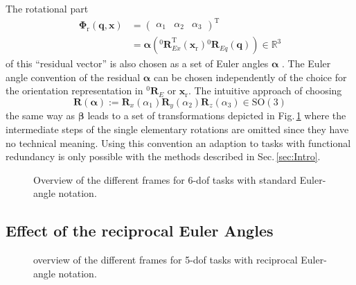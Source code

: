 \documentclass[twocolumn,10pt]{IFTOMM}
\newcommand{\bm}[1]{\boldsymbol{#1}}
\newcommand{\vek}[3]{\boldsymbol{#1}^{#2}_{#3}}
\newcommand{\rotmat}[2]{{{ }^{#1}\boldsymbol{R}}_{#2}}
\newcommand{\transp}[0]{{\mathrm{T}}}
\begin{document}
The rotational part
%
\begin{align}
\bm{\Phi}_{\mathrm{r}}(\bm{q},\bm{x}) &= \begin{pmatrix}
\alpha_1  & \alpha_2 & \alpha_3
\end{pmatrix}^\transp  \nonumber \\
&=\bm{\alpha}\left(\rotmat{0}{Ex}^\transp (\bm{x}_{\mathrm{r}})\rotmat{0}{Eq}(\bm{q})\right) \in {\mathbb{R}}^{3}
\label{equ:Phir_def}
\end{align}
%
of this ``residual vector'' is also chosen as a set of Euler angles $\bm{\alpha}$ \cite{GoldenbergBenFen1985}.
The Euler angle convention of the residual $\bm{\alpha}$ can be chosen independently of the choice for the orientation representation in $\rotmat{0}{E}$ or $\bm{x}_{\mathrm{r}}$.
The intuitive approach of choosing
%
\begin{equation}
\bm{R}(\bm{\alpha}) := \bm{R}_x(\alpha_1) \bm{R}_y(\alpha_2) \bm{R}_z(\alpha_3) \in \mathrm{SO(3)}
\end{equation}
%
the same way as $\bm{\beta}$ leads to a set of transformations depicted in Fig.\,\ref{fig:frames_6dof} where the intermediate steps of the single elementary rotations are omitted since they have no technical meaning.
Using this convention an adaption to tasks with functional redundancy is only possible with the methods described in Sec.\,\ref{sec:Intro}.

\begin{figure}[tb!]
    
    \caption{Overview of the different frames for 6-dof tasks with standard Euler-angle notation.}
    \label{fig:frames_6dof}
\end{figure} 

\subsection{Effect of the reciprocal Euler Angles}
\label{sec:RecEulAng_effect}



\begin{figure}[tb!]
    
    \caption{overview of the different frames for 5-dof tasks with reciprocal Euler-angle notation.}
    \label{fig:frames_5dof}
\end{figure} 


\end{document}
